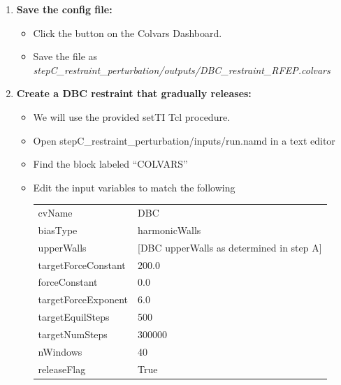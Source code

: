 \documentclass[9pt,tutorial]{Styling/livecoms}
\newcommand{\filepath}[1]{\textit{#1}}
\newcommand{\button}[1]{\inlineBox[gray]{\texttt{#1}}}
\begin{document}
\begin{enumerate}
\begin{enumerate}[label=\alph*., ref=\theenumi.\alph*]
            \item \textbf{Save the config file:}
            \begin{itemize}
                \item Click the \button{Save} button on the Colvars Dashboard.
                \item Save the file as \filepath{stepC\_restraint\_perturbation/outputs/DBC\_restraint\_RFEP.colvars}
            \end{itemize}
        \item \textbf{Create a DBC restraint that gradually releases:} 
            \begin{itemize}
            \item We will use the provided setTI Tcl procedure.
            \item Open stepC\_restraint\_perturbation/inputs/run.namd in a text editor
            \item Find the block labeled ``COLVARS''
            \item Edit the input variables to match the following\\
            { \ttfamily
            \begin{tabular}{l l}
                cvName & DBC\\
                biasType & harmonicWalls\\
                upperWalls & [DBC upperWalls as determined in step A]\\
                targetForceConstant & 200.0\\
                forceConstant & 0.0\\
                targetForceExponent & 6.0\\
                targetEquilSteps & 500\\
                targetNumSteps & 300000\\
                nWindows & 40\\
                releaseFlag & True
            \end{tabular} }
            \end{itemize}
        \end{enumerate}
        

\end{enumerate}
\end{document}
